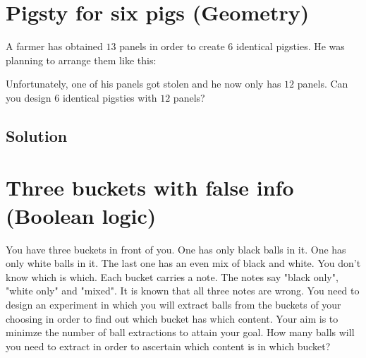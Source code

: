 \documentclass{article}
\begin{document}
\section {Pigsty for six pigs (Geometry)}
A farmer has obtained $13$ panels in order to create 6 identical pigsties. He was planning to arrange them like this:

\begin{center}
\end{center}

Unfortunately, one of his panels got stolen and he now only has $12$ panels. Can you design $6$ identical pigsties with $12$ panels?

\subsection{Solution}

\begin{center}
\end{center}

\section {Three buckets with false info (Boolean logic)}
You have three buckets in front of you. One has only black balls in it. One has only white balls in it. The last one has an even mix of black and white. You don't know which is which. Each bucket carries a note. The notes say "black only", "white only" and "mixed". It is known that all three notes are wrong. You need to design an experiment in which you will extract balls from the buckets of your choosing in order to find out which bucket has which content. Your aim is to minimze the number of ball extractions to attain your goal. How many balls will you need to extract in order to ascertain which content is in which bucket?
\end{document}
